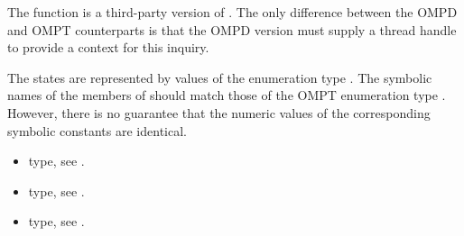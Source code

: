 \descr
The function  is a  third-party version of
. 
The only difference between the OMPD and OMPT counterparts
is that the OMPD version must supply a thread handle to provide
a context for this inquiry.

\argdesc
The states are represented by values of the enumeration type
.
The symbolic names of the members of  should
match those of the OMPT enumeration type .
However, there is no guarantee that the numeric values of the corresponding
symbolic constants are identical.

\crossreferences
\begin{itemize}
	\item {} type, see .
	\item {} type, see .
	\item {} type, see .
\end{itemize}
